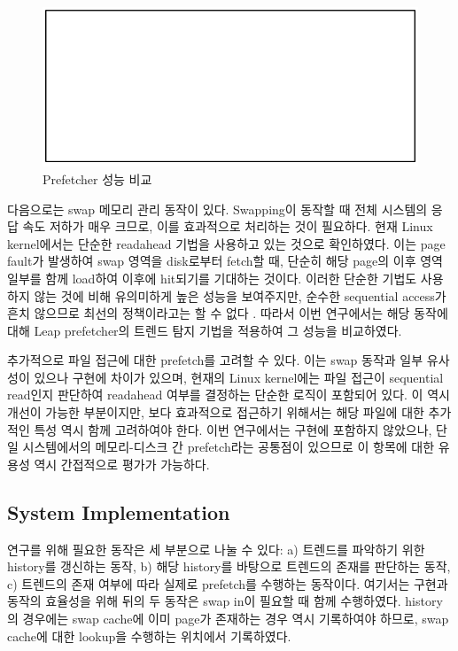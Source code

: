 \documentclass[conference,11pt]{IEEEtran}
\begin{document}
\begin{CJK}{UTF8}{}
    \begin{figure}[t]
        \centerline{\includegraphics[width=\textwidth]{result.png}}
        \caption{Prefetcher 성능 비교}
        \label{fig:result}
    \end{figure}

    다음으로는 swap 메모리 관리 동작이 있다. Swapping이 동작할 때 전체 시스템의 응답 속도 저하가 매우 크므로, 이를 효과적으로 처리하는 것이 필요하다. 현재 Linux kernel에서는 단순한 readahead 기법을 사용하고 있는 것으로 확인하였다. 이는 page fault가 발생하여 swap 영역을 disk로부터 fetch할 때, 단순히 해당 page의 이후 영역 일부를 함께 load하여 이후에 hit되기를 기대하는 것이다. 이러한 단순한 기법도 사용하지 않는 것에 비해 유의미하게 높은 성능을 보여주지만, 순수한 sequential access가 흔치 않으므로 최선의 정책이라고는 할 수 없다 \cite{lwnmmswap}. 따라서 이번 연구에서는 해당 동작에 대해 Leap prefetcher의 트렌드 탐지 기법을 적용하여 그 성능을 비교하였다.

    추가적으로 파일 접근에 대한 prefetch를 고려할 수 있다. 이는 swap 동작과 일부 유사성이 있으나 구현에 차이가 있으며, 현재의 Linux kernel에는 파일 접근이 sequential read인지 판단하여 readahead 여부를 결정하는 단순한 로직이 포함되어 있다. 이 역시 개선이 가능한 부분이지만, 보다 효과적으로 접근하기 위해서는 해당 파일에 대한 추가적인 특성 역시 함께 고려하여야 한다. 이번 연구에서는 구현에 포함하지 않았으나, 단일 시스템에서의 메모리-디스크 간 prefetch라는 공통점이 있으므로 이 항목에 대한 유용성 역시 간접적으로 평가가 가능하다.

    \subsection{System Implementation}

    연구를 위해 필요한 동작은 세 부분으로 나눌 수 있다: a) 트렌드를 파악하기 위한 history를 갱신하는 동작, b) 해당 history를 바탕으로 트렌드의 존재를 판단하는 동작, c) 트렌드의 존재 여부에 따라 실제로 prefetch를 수행하는 동작이다. 여기서는 구현과 동작의 효율성을 위해 뒤의 두 동작은 swap in이 필요할 때 함께 수행하였다. history의 경우에는 swap cache에 이미 page가 존재하는 경우 역시 기록하여야 하므로, swap cache에 대한 lookup을 수행하는 위치에서 기록하였다.


\end{CJK}
\end{document}
